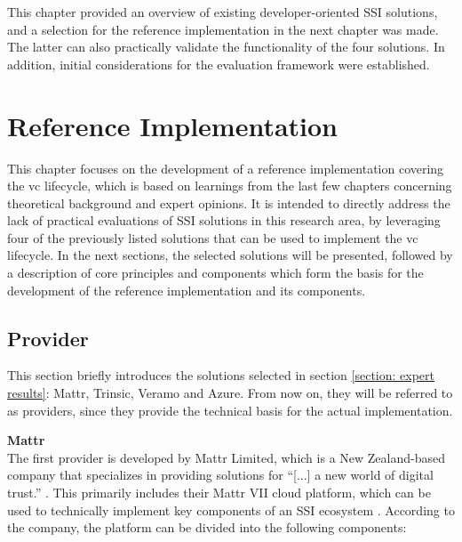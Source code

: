    This chapter provided an overview of existing developer-oriented \ac{SSI} solutions, and a selection for the reference implementation in the next chapter was made. The latter can also practically validate the functionality of the four solutions. In addition, initial considerations for the evaluation framework were established.

\chapter{Reference Implementation}\label{chapter: ref implementation}

This chapter focuses on the development of a reference implementation covering the \ac{vc} lifecycle, which is based on learnings from the last few chapters concerning theoretical background and expert opinions. It is intended to directly address the lack of practical evaluations of \ac{SSI} solutions in this research area, by leveraging four of the previously listed solutions that can be used to implement the \ac{vc} lifecycle. In the next sections, the selected solutions will be presented, followed by a description of core principles and components which form the basis for the development of the reference implementation and its components.

    \section{Provider}
    
    This section briefly introduces the solutions selected in section \ref{section: expert results}: Mattr, Trinsic, Veramo and Azure. From now on, they will be referred to as providers, since they provide the technical basis for the actual implementation.
    
    \textbf{Mattr}\\
    The first provider is developed by Mattr Limited, which is a New Zealand-based company \cite{Mattr_privacy_2021} that specializes in providing solutions for “[...] a new world of digital trust.” \cite{Mattr_Mattr_2021-4}. This primarily includes their Mattr VII cloud platform, which can be used to technically implement key components of an \ac{SSI} ecosystem \cite{Mattr_products_2021}. According to the company, the platform can be divided into the following components: \cite{Mattr_Mattr_2021-2}

